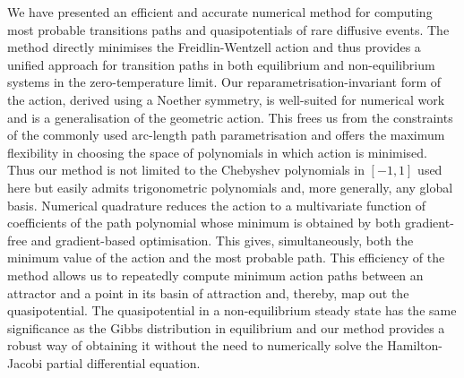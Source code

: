 We have presented an efficient and accurate numerical method for computing
most probable transitions paths and quasipotentials of rare diffusive
events. The method directly minimises the Freidlin-Wentzell action
and thus provides a unified approach for transition
paths in both equilibrium and non-equilibrium systems in the zero-temperature limit. Our reparametrisation-invariant
form of the action, derived using a Noether symmetry, is well-suited
for numerical work and is a generalisation of the geometric action.
This frees us from the constraints of the commonly used arc-length
path parametrisation and offers the maximum flexibility in choosing
the space of polynomials in which action is minimised. Thus our method
is not limited to the Chebyshev polynomials in $[-1,1]$ used here
but easily admits trigonometric polynomials and, more generally, any
global basis. Numerical quadrature reduces the action to a multivariate
function of coefficients of the path polynomial whose minimum is obtained
by both gradient-free and gradient-based optimisation. This gives,
simultaneously, both the minimum value of the action and the most
probable path. This efficiency of the method allows us to repeatedly
compute minimum action paths between an attractor and a point in its
basin of attraction and, thereby, map out the quasipotential. The
quasipotential in a non-equilibrium steady state has the same significance
as the Gibbs distribution in equilibrium and our method provides a
robust way of obtaining it without the need to numerically solve the
Hamilton-Jacobi partial differential equation. 
